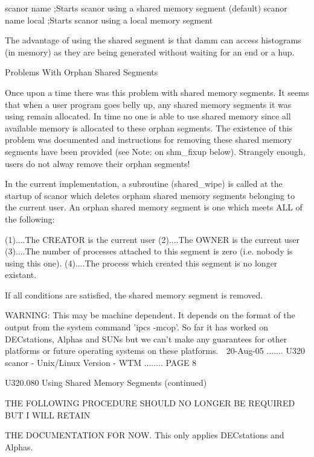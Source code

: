    scanor name        ;Starts scanor using a shared memory segment (default)
   scanor name local  ;Starts scanor using a local  memory segment
 
   The  advantage  of  using  the  shared  segment  is  that  damm  can access
   histograms (in memory) as they are being generated without waiting  for  an
   end or a hup.
 
                      Problems With Orphan Shared Segments
 
   Once  upon  a  time there was this problem with shared memory segments.  It
   seems that when a user program goes belly up, any  shared  memory  segments
   it  was  using  remain  allocated.   In  time  no one is able to use shared
   memory since all available memory is allocated to  these  orphan  segments.
   The  existence of this problem was documented and instructions for removing
   these shared memory segments have been provided  (see  Note:  on  shm_fixup
   below). Strangely enough, users do not alway remove their orphan segments!
 
   In  the current implementation, a subroutine (shared_wipe) is called at the
   startup of scanor which deletes orpham shared memory segments belonging  to
   the  current  user.  An orphan shared memory segment is one which meets ALL
   of the following:
 
   (1)....The CREATOR is the current user
   (2)....The OWNER is the current user
   (3)....The number of processes attached to this segment is zero
          (i.e. nobody is using this one).
   (4)....The process which created this segment is no longer existant.
 
   If all conditions are satisfied, the shared memory segment is removed.
 
   WARNING: This may be machine dependent.  It depends on  the  format  of the
   output  from  the  system  command  'ipcs  -mcop'.  So far it has worked on
   DECstations, Alphas and SUNs but we can't make  any  guarantees  for  other
   platforms or future operating systems on these platforms.
    
   20-Aug-05 ....... U320  scanor - Unix/Linux Version - WTM ........ PAGE   8
 
 
 
   U320.080  Using Shared Memory Segments (continued)
 
 
   THE FOLLOWING PROCEDURE SHOULD NO LONGER BE REQUIRED BUT I WILL RETAIN
 
   THE DOCUMENTATION FOR NOW. This only applies DECstations and Alphas.
 
